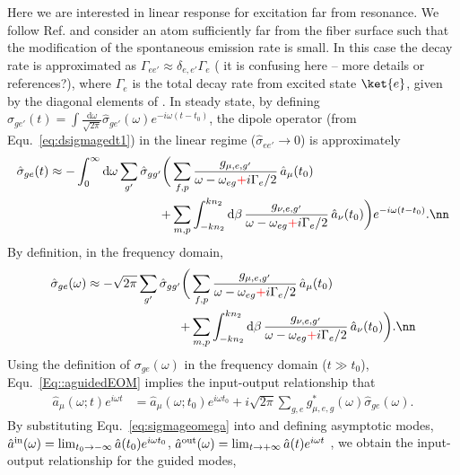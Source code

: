 \documentclass[]{report}
\newcommand{\inp}{{\rm in}}
\newcommand{\out}{{\rm out}}
\newcommand{\comment}[1]{{\color{orange} #1}}
\newcommand{\error}[1]{{\color{red} #1}}
\begin{document}
Here we are interested in linear response for excitation far from resonance.  We follow Ref. \cite{LeKien2014a} and consider an atom sufficiently far from the fiber surface such that the modification of the spontaneous emission rate is small.   In this case the decay rate is approximated as $\Gamma_{ee'} \approx \delta_{e,e'} \Gamma_{e}$ (\comment{it is confusing here -- more details or references?}), where $\Gamma_e$ is the total decay rate from excited state $\ket{e}$, given by the diagonal elements of .  \comment{In steady state}, by defining $ \hat{\sigma}_{ge'}(t)=\int \frac{\mathrm{d}\omega}{\sqrt{2\pi}}\hat{\sigma}_{ge'}(\omega) e^{-i\omega(t-t_0)} $, the dipole operator (from Equ.~\eqref{eq:dsigmagedt1}) in the linear regime ($\hat{\sigma}_{ee'} \rightarrow 0 $) is approximately
	\begin{align}\label{eq:sigmagetint}
		\hat{\sigma}_{ge}(t) \approx -\int_0^{\infty}\mathrm{d}\omega \sum_{g'} \hat{\sigma}_{gg'}\bigg( & \sum_{f,p}  
\frac{g_{\mu, e,g'}}{\omega-\omega_{eg} \error{+} i \Gamma_{e}/2  }\, \hat{a}_\mu (t_0) \\
	+& \sum_{m,p} \int_{-kn_2}^{kn_2}\mathrm{d}\beta \, \frac{g_{\nu, e,g'}}{\omega-\omega_{eg} \error{+} i \Gamma_{e}/2 } \,\hat{a}_\nu (t_0)  \bigg)e^{-i\omega (t-t_0)} . \nn
	\end{align}
By definition, in the frequency domain, 
\begin{align}\label{eq:sigmageomega}
		\hat{\sigma}_{ge}(\omega) \approx - \sqrt{2\pi}\sum_{g'} \hat{\sigma}_{gg'}\bigg( & \sum_{f,p}  
\frac{g_{\mu, e,g'}}{\omega-\omega_{eg} \error{+} i \Gamma_{e}/2  }\, \hat{a}_\mu (t_0) \\
	+& \sum_{m,p} \int_{-kn_2}^{kn_2}\mathrm{d}\beta \, \frac{g_{\nu, e,g'}}{\omega-\omega_{eg} \error{+} i \Gamma_{e}/2 } \,\hat{a}_\nu (t_0)  \bigg) . \nn
\end{align}
Using the definition of $ \sigma_{ge}(\omega) $ in the frequency domain ($ t\gg t_0 $), Equ.~\eqref{Eq::aguidedEOM} implies the input-output relationship that
\begin{align}\label{Eq::aguidedomega}
\hat{a}_\mu(\omega;t )e^{i\omega t} &= \hat{a}_\mu(\omega;t_0)e^{i\omega t_0} +i \sqrt{2\pi}\sum_{g,e}g_{\mu,e,g}^*(\omega)\hat{\sigma}_{ge}(\omega). 
\end{align}
By substituting Equ.~\eqref{eq:sigmageomega} into  and defining asymptotic modes,  $\hat{a}^{\inp}(\omega) = \lim_{t_0\rightarrow -\infty} \hat{a}(t_0) e^{i\omega t_0}$, $\hat{a}^{\out}(\omega) = \lim_{t\rightarrow +\infty} \hat{a}(t) e^{i\omega t}$ \cite{Fan2010}, we obtain the input-output relationship for the guided modes,
\end{document}
